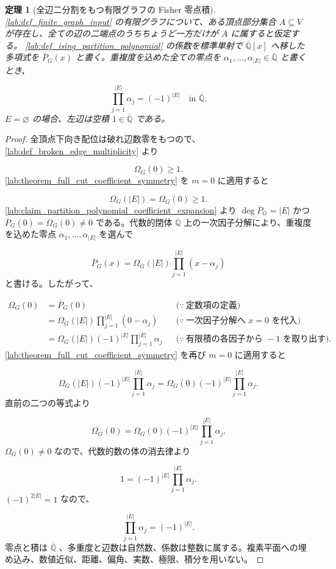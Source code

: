\documentclass[11pt,a4paper]{article}
\newtheorem{theorem}[definition]{定理}
\theoremstyle{remark}
\begin{document}
\begin{theorem}[全辺二分割をもつ有限グラフの Fisher 零点積]\label{lab:theorem_full_cut_fisher_zero_product}
\cref{lab:def_finite_graph_input}
 の有限グラフについて、ある頂点部分集合 
$A\subseteq V$
 が存在し、全ての辺の二端点のうちちょうど一方だけが 
$A$
 に属すると仮定する。
\cref{lab:def_ising_partition_polynomial}
 の係数を標準単射で 
$\overline{\mathbb Q}[x]$
 へ移した多項式を 
$\overline P_G(x)$
 と書く。重複度を込めた全ての零点を 
$\alpha_1,\ldots,\alpha_{|E|}\in\overline{\mathbb Q}$
 と書くとき、

\[\prod_{j=1}^{|E|}\alpha_j=(-1)^{|E|}\quad\text{in }\overline{\mathbb Q}.\]
$E=\varnothing$
 の場合、左辺は空積 
$1\in\overline{\mathbb Q}$
 である。

\end{theorem}
\begin{proof}
全頂点下向き配位は破れ辺数零をもつので、
\cref{lab:def_broken_edge_multiplicity}
 より

\[\Omega_G(0)\geq1.\]
\cref{lab:theorem_full_cut_coefficient_symmetry}
 を 
$m=0$
 に適用すると

\[\Omega_G(|E|)=\Omega_G(0)\geq1.\]
\cref{lab:claim_partition_polynomial_coefficient_expansion}
 より 
$\deg\overline P_G=|E|$
 かつ 
$\overline P_G(0)=\Omega_G(0)\ne0$
 である。代数的閉体 
$\overline{\mathbb Q}$
 上の一次因子分解により、重複度を込めた零点 
$\alpha_1,\ldots,\alpha_{|E|}$
 を選んで

\[\overline P_G(x)
=\Omega_G(|E|)\prod_{j=1}^{|E|}(x-\alpha_j)\]
と書ける。したがって、

\[\begin{aligned}
\Omega_G(0)
&=\overline P_G(0)
&&\bigl(\because\ \text{定数項の定義}\bigr)\\
&=\Omega_G(|E|)\prod_{j=1}^{|E|}(0-\alpha_j)
&&\bigl(\because\ \text{一次因子分解へ }x=0\text{ を代入}\bigr)\\
&=\Omega_G(|E|)(-1)^{|E|}\prod_{j=1}^{|E|}\alpha_j
&&\bigl(\because\ \text{有限積の各因子から }-1\text{ を取り出す}\bigr).
\end{aligned}\]
\cref{lab:theorem_full_cut_coefficient_symmetry}
 を再び 
$m=0$
 に適用すると

\[\Omega_G(|E|)(-1)^{|E|}\prod_{j=1}^{|E|}\alpha_j
=\Omega_G(0)(-1)^{|E|}\prod_{j=1}^{|E|}\alpha_j.\]
直前の二つの等式より

\[\Omega_G(0)=\Omega_G(0)(-1)^{|E|}\prod_{j=1}^{|E|}\alpha_j.\]
$\Omega_G(0)\ne0$
 なので、代数的数の体の消去律より

\[1=(-1)^{|E|}\prod_{j=1}^{|E|}\alpha_j.\]
$(-1)^{2|E|}=1$
 なので、

\[\prod_{j=1}^{|E|}\alpha_j=(-1)^{|E|}.\]
零点と積は 
$\overline{\mathbb Q}$
、多重度と辺数は自然数、係数は整数に属する。複素平面への埋め込み、数値近似、距離、偏角、実数、極限、積分を用いない。

\end{proof}
\end{document}
